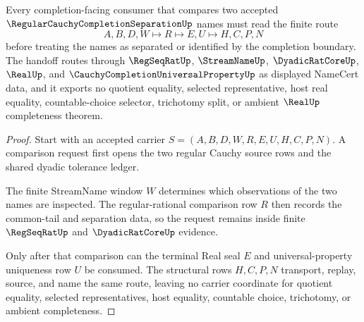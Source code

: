 \begin{theorem}
\label{thm:regular-cauchy-completion-separation-handoff}
Every completion-facing consumer that compares two accepted $\RegularCauchyCompletionSeparationUp$ names must read the finite route
$$
A,B,D,W \longmapsto R \longmapsto E,U \longmapsto H,C,P,N
$$
before treating the names as separated or identified by the completion boundary. The handoff routes through $\RegSeqRatUp$, $\StreamNameUp$, $\DyadicRatCoreUp$, $\RealUp$, and $\CauchyCompletionUniversalPropertyUp$ as displayed NameCert data, and it exports no quotient equality, selected representative, host real equality, countable-choice selector, trichotomy split, or ambient $\RealUp$ completeness theorem.
\end{theorem}
\begin{proof}
Start with an accepted carrier $S=(A,B,D,W,R,E,U,H,C,P,N)$. A comparison request first opens the two regular Cauchy source rows and the shared dyadic tolerance ledger.

The finite StreamName window $W$ determines which observations of the two names are inspected. The regular-rational comparison row $R$ then records the common-tail and separation data, so the request remains inside finite $\RegSeqRatUp$ and $\DyadicRatCoreUp$ evidence.

Only after that comparison can the terminal Real seal $E$ and universal-property uniqueness row $U$ be consumed. The structural rows $H,C,P,N$ transport, replay, source, and name the same route, leaving no carrier coordinate for quotient equality, selected representatives, host equality, countable choice, trichotomy, or ambient completeness.
\end{proof}


